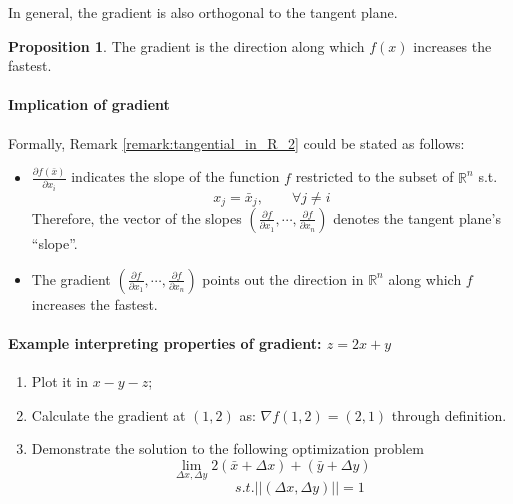 \documentclass[12pt]{article}
\newcommand{\R}{{\mathbb R}}
\theoremstyle{definition}
\newtheorem{proposition}[theorem]{Proposition}
\theoremstyle{plain}
\begin{document}
In general, the gradient is also orthogonal to the tangent plane.

\begin{proposition}
    The gradient is the direction along which $f(x)$ increases the fastest.
\end{proposition}


\paragraph{Implication of gradient}
Formally, Remark \ref{remark:tangential_in_R_2} could be stated as follows: 
\begin{itemize}
    \item $\frac{\partial f(\bar x)}{\partial x_i}$ indicates the slope of the 
        function $f$ restricted to the subset of $\R^n$ s.t. 
        \[
            x_j = \bar x_j , \qquad \forall j \not = i
        \]
        Therefore, the vector of the slopes
        $ \left( \frac{\partial f}{ \partial x_1}, \cdots, \frac{\partial f}{\partial x_n} \right) $
        denotes the tangent plane's ``slope''.

    \item The gradient $\left( \frac{\partial f}{ \partial x_1}, \cdots, 
        \frac{\partial f}{\partial x_n} \right)$ points out the direction in 
        $\R^n$ along which $f$ increases the fastest.
\end{itemize}

\paragraph{Example interpreting properties of gradient: $z= 2x + y$}
\begin{enumerate}
    \item Plot it in $x-y-z$;
    \item Calculate the gradient at $(1,2)$ as: $\nabla f(1,2) = (2,1)$ through 
        definition.
    \item Demonstrate the solution to the following optimization problem 
        \[
            \underset{\Delta x, \Delta y} \lim 2(\bar x + \Delta x) + (\bar y + 
            \Delta y)
        \]
        \[\qquad \qquad s.t. || (\Delta x , \Delta y) || =  1\]
\end{enumerate}
\end{document}
